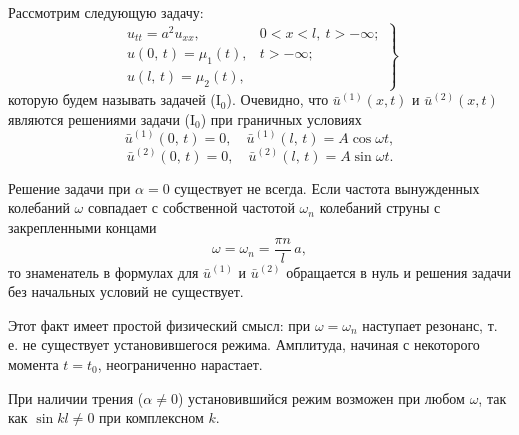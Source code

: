 \documentclass{article}
\begin{document}
Рассмотрим следующую задачу:
\begin{equation*}
\left.
\begin{array}{ll}
u_{tt} = a^{2}u_{xx}, & 0 < x < l,\ t > -\infty; \\
u(0,\,t) = \mu_{1}(t), & t > -\infty; \\
u(l,\,t) = \mu_{2}(t), &
\end{array}
\right\} \tag{I$_0$}
\end{equation*}
которую будем называть задачей (I$_0$). Очевидно, что $\bar{u}^{(1)}(x,t)$ и $\bar{u}^{(2)}(x,t)$ являются решениями задачи (I$_0$) при граничных условиях
\begin{equation*}
\bar{u}^{(1)}(0,\,t) = 0, \quad \bar{u}^{(1)}(l,\,t) = A\cos\omega t,
\end{equation*}
\begin{equation*}
\bar{u}^{(2)}(0,\,t) = 0, \quad \bar{u}^{(2)}(l,\,t) = A\sin\omega t.
\end{equation*}

Решение задачи при $\alpha = 0$ существует не всегда. Если частота вынужденных колебаний $\omega$ совпадает с собственной частотой $\omega_{n}$ колебаний струны с закрепленными концами
\begin{equation*}
\omega = \omega_{n} = \frac{\pi n}{l}\,a,
\end{equation*}
то знаменатель в формулах для $\bar{u}^{(1)}$ и $\bar{u}^{(2)}$ обращается в нуль и решения задачи без начальных условий не существует.

Этот факт имеет простой физический смысл: при $\omega = \omega_{n}$ наступает резонанс, т. е. не существует установившегося режима. Амплитуда, начиная с некоторого момента $t = t_0$, неограниченно нарастает.

При наличии трения ($\alpha \neq 0$) установившийся режим возможен при любом $\omega$, так как $\sin kl \neq 0$ при комплексном $k$.
\end{document}

